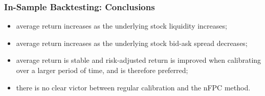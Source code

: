 %
%

\begin{frame}
\frametitle{In-Sample Backtesting: Conclusions}
\begin{itemize}
\item average return increases as the underlying stock liquidity increases;
\item average return increases as the underlying stock bid-ask spread decreases;
\item average return is stable and risk-adjusted return is improved when calibrating over a larger period of time, and is therefore preferred;
\item there is no clear victor between regular calibration and the nFPC method.
\end{itemize}
\end{frame}

